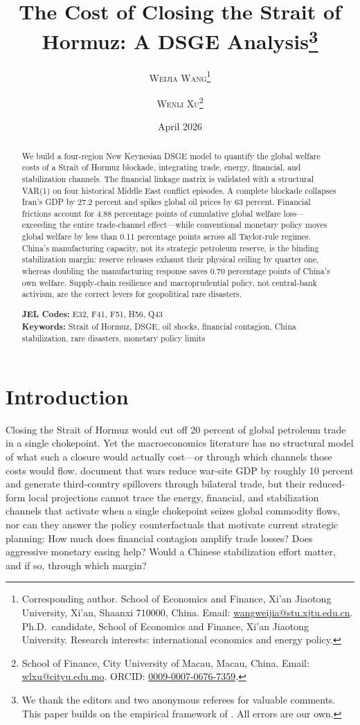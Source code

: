 \documentclass[12pt]{article}
\title{\textbf{The Cost of Closing the Strait of Hormuz: A DSGE Analysis}\thanks{We thank the editors and two anonymous referees for valuable comments. This paper builds on the empirical framework of \citet{federle2026price}. All errors are our own.}}
\author{
  \textsc{Weijia Wang}\thanks{Corresponding author. School of Economics and Finance, Xi'an Jiaotong University, Xi'an, Shaanxi 710000, China. Email: \href{mailto:wangweijia@stu.xjtu.edu.cn}{wangweijia@stu.xjtu.edu.cn}. Ph.D.\ candidate, School of Economics and Finance, Xi'an Jiaotong University. Research interests: international economics and energy policy.}
  \and
  \textsc{Wenli Xu}\thanks{School of Finance, City University of Macau, Macau, China. Email: \href{mailto:wlxu@cityu.edu.mo}{wlxu@cityu.edu.mo}. ORCID: \href{https://orcid.org/0009-0007-0676-7359}{0009-0007-0676-7359}.}
}
\date{April 2026}
\begin{document}
\maketitle

\begin{abstract}
\noindent
We build a four-region New Keynesian DSGE model to quantify the global welfare costs of a Strait of Hormuz blockade, integrating trade, energy, financial, and stabilization channels. The financial linkage matrix is validated with a structural VAR(1) on four historical Middle East conflict episodes. A complete blockade collapses Iran's GDP by 27.2 percent and spikes global oil prices by 63 percent. Financial frictions account for 4.88 percentage points of cumulative global welfare loss---exceeding the entire trade-channel effect---while conventional monetary policy moves global welfare by less than 0.11 percentage points across all Taylor-rule regimes. China's manufacturing capacity, not its strategic petroleum reserve, is the binding stabilization margin: reserve releases exhaust their physical ceiling by quarter one, whereas doubling the manufacturing response saves 0.70 percentage points of China's own welfare. Supply-chain resilience and macroprudential policy, not central-bank activism, are the correct levers for geopolitical rare disasters.

\bigskip
\noindent \textbf{JEL Codes:} E32, F41, F51, H56, Q43 \\
\noindent \textbf{Keywords:} Strait of Hormuz, DSGE, oil shocks, financial contagion, China stabilization, rare disasters, monetary policy limits
\end{abstract}

\thispagestyle{empty}
\newpage
\setcounter{page}{1}



\section{Introduction}

Closing the Strait of Hormuz would cut off 20 percent of global petroleum trade in a single chokepoint. Yet the macroeconomics literature has no structural model of what such a closure would actually cost---or through which channels those costs would flow. \citet{federle2026price} document that wars reduce war-site GDP by roughly 10 percent and generate third-country spillovers through bilateral trade, but their reduced-form local projections cannot trace the energy, financial, and stabilization channels that activate when a single chokepoint seizes global commodity flows, nor can they answer the policy counterfactuals that motivate current strategic planning: How much does financial contagion amplify trade losses? Does aggressive monetary easing help? Would a Chinese stabilization effort matter, and if so, through which margin?
\end{document}
